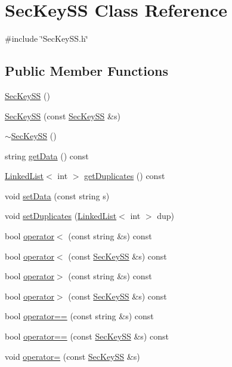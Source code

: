 \hypertarget{classSecKeySS}{}\section{Sec\+Key\+SS Class Reference}
\label{classSecKeySS}


{\ttfamily \#include \char`\"{}Sec\+Key\+S\+S.\+h\char`\"{}}

\subsection*{Public Member Functions}
\begin{DoxyCompactItemize}
\item 
\hyperlink{classSecKeySS_ac9755234e20529a29a679c699007221c}{Sec\+Key\+SS} ()
\item 
\hyperlink{classSecKeySS_a3554b7d953e609578660dc27c8c855c5}{Sec\+Key\+SS} (const \hyperlink{classSecKeySS}{Sec\+Key\+SS} \&s)
\item 
\hyperlink{classSecKeySS_a298a0bd8755355351318c8f45f879e09}{$\sim$\+Sec\+Key\+SS} ()
\item 
string \hyperlink{classSecKeySS_add52510d280d0ca89b653386500f08f5}{get\+Data} () const
\item 
\hyperlink{classLinkedList}{Linked\+List}$<$ int $>$ \hyperlink{classSecKeySS_aaae9db891cfcdc3f78d8a44145f4f08c}{get\+Duplicates} () const
\item 
void \hyperlink{classSecKeySS_a36138c92d21970c5dc22c6517a139d2b}{set\+Data} (const string s)
\item 
void \hyperlink{classSecKeySS_ac1d550d7d3ad864f169d63523031a341}{set\+Duplicates} (\hyperlink{classLinkedList}{Linked\+List}$<$ int $>$ dup)
\item 
bool \hyperlink{classSecKeySS_a78079357a58189d507415df5200fa1de}{operator$<$} (const string \&s) const
\item 
bool \hyperlink{classSecKeySS_a7851dc86b5a8658d8dc8fd54174aaee9}{operator$<$} (const \hyperlink{classSecKeySS}{Sec\+Key\+SS} \&s) const
\item 
bool \hyperlink{classSecKeySS_a6b069a8bbb129059eab7158c3644c05d}{operator$>$} (const string \&s) const
\item 
bool \hyperlink{classSecKeySS_a6d33595d05da2f8160754962f3a72c9e}{operator$>$} (const \hyperlink{classSecKeySS}{Sec\+Key\+SS} \&s) const
\item 
bool \hyperlink{classSecKeySS_ac7ac8ff28deb97fe49c993a5e70c55c2}{operator==} (const string \&s) const
\item 
bool \hyperlink{classSecKeySS_ae0dd65edcf924c2ba31d713d43451937}{operator==} (const \hyperlink{classSecKeySS}{Sec\+Key\+SS} \&s) const
\item 
void \hyperlink{classSecKeySS_a3f4dd72a65e6485556389f44b6739d73}{operator=} (const \hyperlink{classSecKeySS}{Sec\+Key\+SS} \&s)
\end{DoxyCompactItemize}


